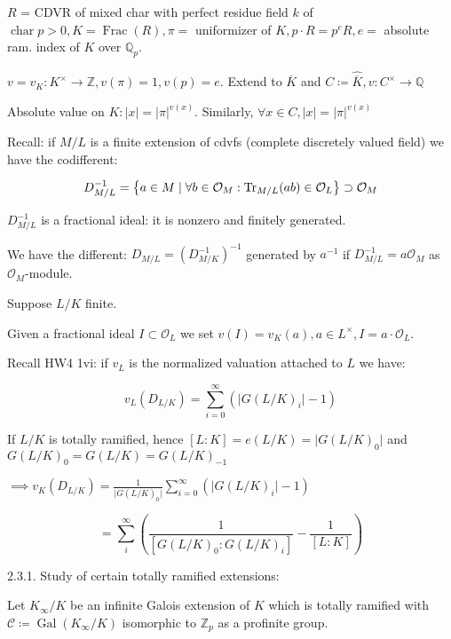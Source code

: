 \documentclass{article}
\theoremstyle{definition}
\numberwithin{theorem}{subsection}
\begin{document}
    \(R\) = CDVR of mixed char with perfect residue field \(k\) of \(\operatorname{char} p > 0, K = \operatorname{Frac}(R), \pi =\) uniformizer of \(K, p\cdot R = p^e R, e =\) absolute ram. index of \(K\) over \(\mathbb{Q}_p\).


    \(v = v_K: K^\times \to \mathbb{Z} , v(\pi) = 1, v(p) = e\). Extend to \(\overline{K}\) and \(C \coloneqq \widehat{\overline{K}}, v: C^\times \to \mathbb{Q}\)
    
    Absolute value on \(K: \vert x \vert = \vert \pi \vert^{v(x)}\). Similarly, \(\forall x\in C, \vert x \vert = \vert \pi \vert^{v(x)}\)

    Recall: if \(M / L\) is a finite extension of cdvfs (complete discretely valued field) we have the codifferent:

    \[
        D_{M / L}^{-1} = \left\{ a\in M \mid \forall b\in \mathcal{O}_M: \Tr_{M / L} (ab) \in \mathcal{O}_L \right\} \supset \mathcal{O}_M
    \]


    \(D_{M / L} ^{-1}\) is a fractional ideal: it is nonzero and finitely generated.

    We have the different: \(D_{M / L} = (D ^{-1} _{M / K}) ^{-1}\) generated by \(a ^{-1}\) if \(D_{M / L} ^{-1} = a \mathcal{O}_M\) as \(\mathcal{O}_M\)-module.

    Suppose \(L / K\) finite.

    Given a fractional ideal \(I \subset \mathcal{O}_L\) we set \(v(I) = v_K(a), a\in L^\times, I = a \cdot \mathcal{O}_L\).

    Recall HW4 1vi: if \(v_L\) is the normalized valuation attached to \(L\) we have:

    \[
        v_L(D_{L / K}) = \sum_{i=0}^{\infty} (\vert G(L / K)_i \vert - 1)
    \]

    If \(L / K\) is totally ramified, hence \([L:K] = e(L / K) = \vert G(L / K)_0 \vert\) and \(G(L / K)_0 = G(L / K) = G(L / K)_{-1}\)

    \(\implies v_K(D_{L / K}) = \frac{1}{\vert G(L / K)_0 \vert} \sum_{i=0}^{\infty} (\vert G(L / K)_i \vert - 1)\) 

    \[
        = \sum_{i}^{\infty} \left( \frac{1}{[G(L / K)_0 : G(L / K)_i]} - \frac{1}{[L:K]} \right)
    \]

    2.3.1. Study of certain totally ramified extensions:

    Let \(K_{\infty} / K\) be an infinite Galois extension of \(K\) which is totally ramified with \(\mathscr{C} \coloneqq \operatorname{Gal}(K_\infty / K)\) isomorphic to \(\mathbb{Z}_p\) as a profinite group.
\end{document}

